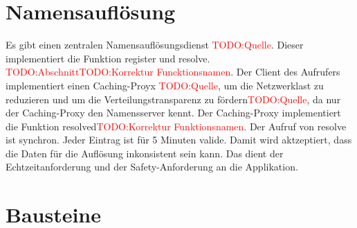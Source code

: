 \section{Namensauflösung}
Es gibt einen zentralen Namensauflösungsdienst \textcolor{red}{TODO:Quelle}. Dieser implementiert die Funktion \glqq{}register\grqq{} und \glqq{}resolve\grqq{}. \textcolor{red}{TODO:Abschnitt}\textcolor{red}{TODO:Korrektur Funcktionsnamen}. Der Client des Aufrufers implementiert einen Caching-Proyx \textcolor{red}{TODO:Quelle}, um die Netzwerklast zu reduzieren und um die Verteilungstransparenz zu fördern\textcolor{red}{TODO:Quelle}, da nur der Caching-Proxy den Namensserver kennt. Der Caching-Proxy implementiert die Funktion \glqq{}resolved\grqq{}\textcolor{red}{TODO:Korrektur Funktionsnamen}. Der Aufruf von \glqq{}resolve\grqq{} ist synchron. Jeder Eintrag ist für 5 Minuten valide. Damit wird aktzeptiert, dass die Daten für die Auflösung inkonsistent sein kann. Das dient der Echtzeitanforderung und der Safety-Anforderung an die Applikation.



\newcommand{\comment}[1]{}

\comment{
	@startuml
	title Middleware-Komponenten – Asynchrones RPC (ohne Anwendung)
	
	package "Client-Middleware" {
		[Client-Proxy]
		[Marshalling]
		[Async RPC Sender]
		
		
	}
	
	package "Middleware Infrastruktur" {
		[Naming Service]
		[Message Transport]
	}
	
	[Client-Proxy] --> [Naming Service] : Dienstadresse auflösen
	[Client-Proxy] --> [Marshalling] : Argumente serialisieren
	[Marshalling] --> [Async RPC Sender] : Anfrage senden
	package "Server-Middleware" {
		[Async RPC Receiver]
		[Unmarshalling]
		[Server-Skeleton]
		
		[Async RPC Receiver] --> [Unmarshalling] : Deserialisieren
		[Unmarshalling] --> [Server-Skeleton] : Methodenaufruf
	}
	
	
	[Async RPC Sender] --> [Message Transport]
	[Message Transport] --> [Async RPC Receiver]
	@enduml
}




\section*{Bausteine}

